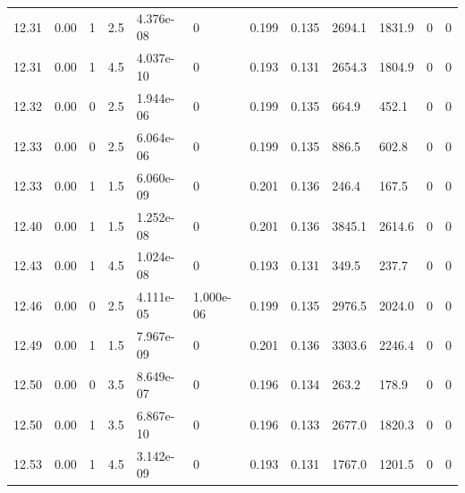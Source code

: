 \documentclass[preview]{standalone}
\begin{document}
{{{{{{{{{{{{\begin{tabular}{L{1.2cm}C{1.2cm} C{0.3cm}C{0.5cm} C{1.4cm}C{1.4cm} C{1.4cm}C{1.4cm} C{1.6cm}C{1.6cm} C{1.6cm}C{1.6cm}}
  12.31  &  0.00  & 1     & 2.5 &  4.376e-08  & 0  &  0.199&   0.135& 2694.1 & 1831.9   &  0 & 0  \\ 
  12.31  &  0.00  & 1     & 4.5 &  4.037e-10  & 0  &  0.193&   0.131& 2654.3 & 1804.9   &  0 & 0  \\ 
  12.32  &  0.00  & 0     & 2.5 &  1.944e-06  & 0  &  0.199&   0.135& 664.9 & 452.1   &  0 & 0  \\ 
  12.33  &  0.00  & 0     & 2.5 &  6.064e-06  & 0  &  0.199&   0.135& 886.5 & 602.8   &  0 & 0  \\ 
  12.33  &  0.00  & 1     & 1.5 &  6.060e-09  & 0  &  0.201&   0.136& 246.4 & 167.5   &  0 & 0  \\ 
  12.40  &  0.00  & 1     & 1.5 &  1.252e-08  & 0  &  0.201&   0.136& 3845.1 & 2614.6   &  0 & 0  \\ 
  12.43  &  0.00  & 1     & 4.5 &  1.024e-08  & 0  &  0.193&   0.131& 349.5 & 237.7   &  0 & 0  \\ 
  12.46  &  0.00  & 0     & 2.5 &  4.111e-05  & 1.000e-06  &  0.199&   0.135& 2976.5 & 2024.0   &  0 & 0  \\ 
  12.49  &  0.00  & 1     & 1.5 &  7.967e-09  & 0  &  0.201&   0.136& 3303.6 & 2246.4   &  0 & 0  \\ 
  12.50  &  0.00  & 0     & 3.5 &  8.649e-07  & 0  &  0.196&   0.134& 263.2 & 178.9   &  0 & 0  \\ 
  12.50  &  0.00  & 1     & 3.5 &  6.867e-10  & 0  &  0.196&   0.133& 2677.0 & 1820.3   &  0 & 0  \\ 
  12.53  &  0.00  & 1     & 4.5 &  3.142e-09  & 0  &  0.193&   0.131& 1767.0 & 1201.5   &  0 & 0  \\ 
\hline 
\end{tabular} 

}}}}}}}}}}}}
\end{document}
